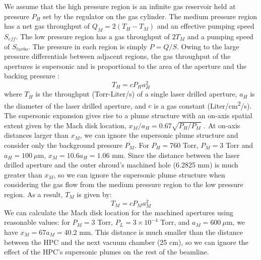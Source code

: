 We assume that the high pressure region is an infinite gas reservoir held at pressure $P_H$ set by the regulator on the gas cylinder. The medium pressure region has a net gas throughput of $Q_M = 2(T_H - T_M)$ and an effective pumping speed $S_{eff}$. The low pressure region has a gas throughput of $2T_M$ and a pumping speed of $S_{turbo}$. The pressure in each region is simply $P = Q / S$. Owing to the large pressure differentials between adjacent regions, the gas throughput of the apertures is supersonic and is proportional to the area of the aperture and the backing pressure \cite{millerFreeJetSources1988}:
\begin{equation}
T_H = c P_H a_H^2
\end{equation}
where $T_H$ is the throughput (Torr-Liter/s) of a single laser drilled aperture, $a_H$ is the diameter of the laser drilled aperture, and $c$ is a gas constant (Liter/cm\textsuperscript{2}/s). The supersonic expansion gives rise to a plume structure with an on-axis spatial extent given by the Mach disk location, $x_M / a_H = 0.67 \sqrt{P_H/P_M}$ \cite{millerFreeJetSources1988}. At on-axis distances larger than $x_M$, we can ignore the supersonic plume structure and consider only the background pressure $P_M$. For $P_H = 760$ Torr, $P_M = 3$ Torr and $a_H = 100 \ \mu$m, $x_M = 10.6 a_H = 1.06$ mm. Since the distance between the laser drilled aperture and the outer shroud's machined hole (6.2825 mm) is much greater than $x_M$, so we can ignore the supersonic plume structure when considering the gas flow from the medium pressure region to the low pressure region. As a result, $T_M$ is given by:
\begin{equation}
T_M = c P_M a_M^2
\end{equation}
We can calculate the Mach disk location for the machined apertures using reasonable values: for $P_M = 3$ Torr, $P_L = 3 \times 10^{-4}$ Torr, and $a_M = 600 \ \mu$m, we have $x_M = 67 a_M = 40.2$ mm. This distance is much smaller than the distance between the HPC and the next vacuum chamber (25 cm), so we can ignore the effect of the HPC's supersonic plumes on the rest of the beamline.

